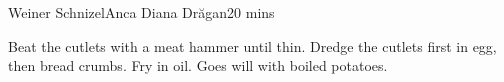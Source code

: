 \begin{recipe}{Weiner Schnizel}{Anca Diana Dr\u{a}gan}{20 mins}
  
  Beat the cutlets with a meat hammer until thin. Dredge the cutlets first in
  egg, then bread crumbs. Fry in oil. Goes will with boiled potatoes.
\end{recipe}
